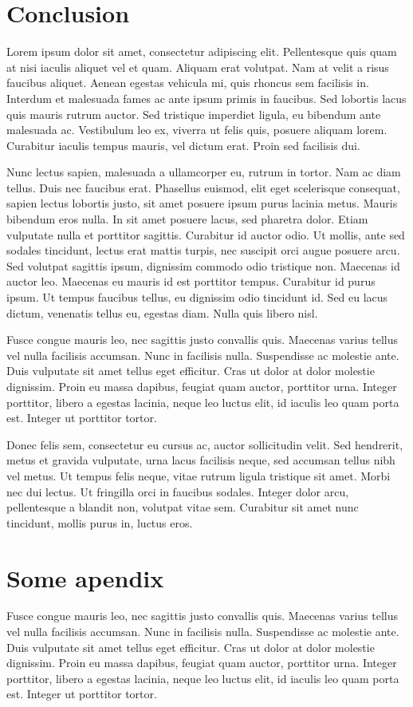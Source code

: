 \documentclass{UoYCSproject}
\begin{document}
\chapter{Conclusion}
\label{cha:conclusion}
Lorem ipsum dolor sit amet, consectetur adipiscing elit. Pellentesque quis quam at nisi iaculis aliquet vel et quam. Aliquam erat volutpat. Nam at velit a risus faucibus aliquet. Aenean egestas vehicula mi, quis rhoncus sem facilisis in. Interdum et malesuada fames ac ante ipsum primis in faucibus. Sed lobortis lacus quis mauris rutrum auctor. Sed tristique imperdiet ligula, eu bibendum ante malesuada ac. Vestibulum leo ex, viverra ut felis quis, posuere aliquam lorem. Curabitur iaculis tempus mauris, vel dictum erat. Proin sed facilisis dui.

Nunc lectus sapien, malesuada a ullamcorper eu, rutrum in tortor. Nam ac diam tellus. Duis nec faucibus erat. Phasellus euismod, elit eget scelerisque consequat, sapien lectus lobortis justo, sit amet posuere ipsum purus lacinia metus. Mauris bibendum eros nulla. In sit amet posuere lacus, sed pharetra dolor. Etiam vulputate nulla et porttitor sagittis. Curabitur id auctor odio. Ut mollis, ante sed sodales tincidunt, lectus erat mattis turpis, nec suscipit orci augue posuere arcu. Sed volutpat sagittis ipsum, dignissim commodo odio tristique non. Maecenas id auctor leo. Maecenas eu mauris id est porttitor tempus. Curabitur id purus ipsum. Ut tempus faucibus tellus, eu dignissim odio tincidunt id. Sed eu lacus dictum, venenatis tellus eu, egestas diam. Nulla quis libero nisl.

Fusce congue mauris leo, nec sagittis justo convallis quis. Maecenas varius tellus vel nulla facilisis accumsan. Nunc in facilisis nulla. Suspendisse ac molestie ante. Duis vulputate sit amet tellus eget efficitur. Cras ut dolor at dolor molestie dignissim. Proin eu massa dapibus, feugiat quam auctor, porttitor urna. Integer porttitor, libero a egestas lacinia, neque leo luctus elit, id iaculis leo quam porta est. Integer ut porttitor tortor.

Donec felis sem, consectetur eu cursus ac, auctor sollicitudin velit. Sed hendrerit, metus et gravida vulputate, urna lacus facilisis neque, sed accumsan tellus nibh vel metus. Ut tempus felis neque, vitae rutrum ligula tristique sit amet. Morbi nec dui lectus. Ut fringilla orci in faucibus sodales. Integer dolor arcu, pellentesque a blandit non, volutpat vitae sem. Curabitur sit amet nunc tincidunt, mollis purus in, luctus eros.

\appendix
\chapter{Some apendix}
Fusce congue mauris leo, nec sagittis justo convallis quis. Maecenas varius tellus vel nulla facilisis accumsan. Nunc in facilisis nulla. Suspendisse ac molestie ante. Duis vulputate sit amet tellus eget efficitur. Cras ut dolor at dolor molestie dignissim. Proin eu massa dapibus, feugiat quam auctor, porttitor urna. Integer porttitor, libero a egestas lacinia, neque leo luctus elit, id iaculis leo quam porta est. Integer ut porttitor tortor.
\end{document}
